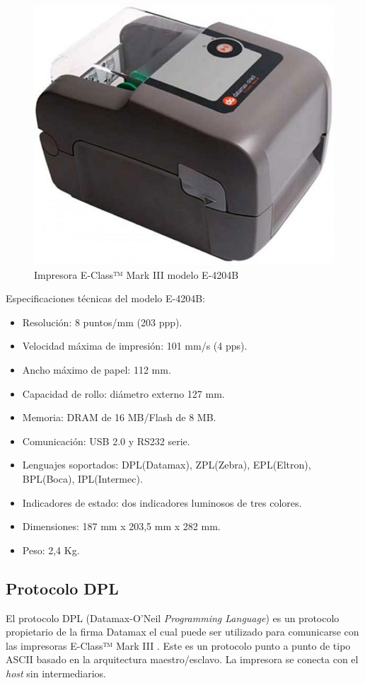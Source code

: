 \begin{figure}[htpb]
	\centering
	\includegraphics[scale=0.3]{./Figures/printer.jpeg}
	\caption{Impresora E-Class™ Mark III modelo E-4204B}
	\label{fig:printer}
\end{figure}


Especificaciones técnicas del modelo E-4204B:
\begin{itemize}
\item Resolución: 8 puntos/mm (203 ppp).
\item Velocidad máxima de impresión: 101 mm/s (4 pps).
\item Ancho máximo de papel: 112 mm.
\item Capacidad de rollo: diámetro externo 127 mm.
\item Memoria: DRAM de 16 MB/Flash de 8 MB.
\item Comunicación: USB 2.0 y RS232 serie.
\item Lenguajes soportados: DPL(Datamax), ZPL(Zebra), EPL(Eltron), BPL(Boca), IPL(Intermec).
\item Indicadores de estado: dos indicadores luminosos de tres colores.
\item Dimensiones: 187 mm x 203,5 mm x 282 mm.
\item Peso: 2,4 Kg.
\end{itemize}

\subsection{Protocolo DPL}
El protocolo DPL (Datamax-O’Neil \textit{Programming Language}) es un protocolo propietario de la firma Datamax el cual puede ser utilizado para comunicarse con las impresoras E-Class™ Mark III \citep{DPL_man}. Este es un protocolo punto a punto de tipo ASCII basado en la arquitectura maestro/esclavo. La impresora se conecta con el \textit{host} sin intermediarios.

